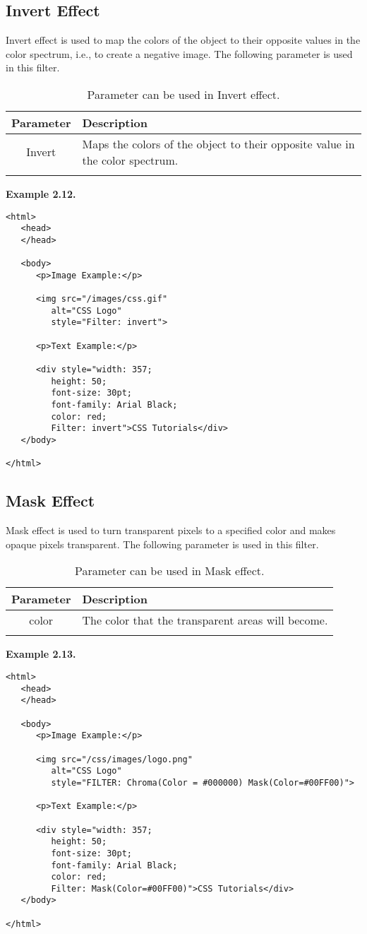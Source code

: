 \documentclass[a4paper,oneside]{book}
\numberwithin{equation}{chapter}
\begin{document}
\subsection{Invert Effect}
Invert effect is used to map the colors of the object to their opposite values in the color spectrum, i.e., to create a negative image. The following parameter is used in this filter.
\begin{center}
\begin{longtable}{|c|p{9cm}|}
\hline
\textbf{Parameter} & \textbf{Description}\\
\hline
Invert & Maps the colors of the object to their opposite value in the color spectrum.\\
\hline
\caption{Parameter can be used in Invert effect.}
\end{longtable}
\end{center}
\textbf{Example 2.12.}
\begin{verbatim}
<html>
   <head>
   </head>
   
   <body>
      <p>Image Example:</p>
      
      <img src="/images/css.gif" 
         alt="CSS Logo" 
         style="Filter: invert">
      
      <p>Text Example:</p>
      
      <div style="width: 357; 
         height: 50; 
         font-size: 30pt; 
         font-family: Arial Black; 
         color: red; 
         Filter: invert">CSS Tutorials</div>
   </body>
   
</html> 
\end{verbatim}
\subsection{Mask Effect}
Mask effect is used to turn transparent pixels to a specified color and makes opaque pixels transparent. The following parameter is used in this filter.
\begin{center}
\begin{longtable}{|c|p{9cm}|}
\hline
\textbf{Parameter} & \textbf{Description}\\
\hline
color & The color that the transparent areas will become.\\
\hline
\caption{Parameter can be used in Mask effect.}
\end{longtable}
\end{center}
\textbf{Example 2.13.}
\begin{verbatim}
<html>
   <head>
   </head>
   
   <body>
      <p>Image Example:</p>
      
      <img src="/css/images/logo.png" 
         alt="CSS Logo" 
         style="FILTER: Chroma(Color = #000000) Mask(Color=#00FF00)">
      
      <p>Text Example:</p>
      
      <div style="width: 357; 
         height: 50; 
         font-size: 30pt; 
         font-family: Arial Black; 
         color: red; 
         Filter: Mask(Color=#00FF00)">CSS Tutorials</div>
   </body>
   
</html> 
\end{verbatim}
\end{document}
